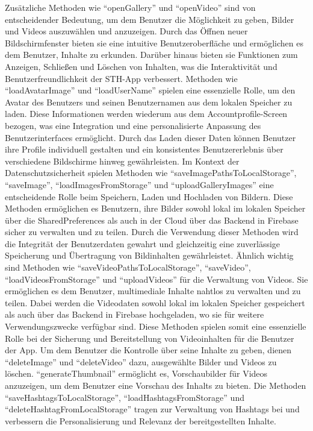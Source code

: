 Zusätzliche Methoden wie ``openGallery'' und ``openVideo'' sind von entscheidender Bedeutung, um dem Benutzer die Möglichkeit zu geben, Bilder und Videos auszuwählen und anzuzeigen. 
Durch das Öffnen neuer Bildschirmfenster bieten sie eine intuitive Benutzeroberfläche und ermöglichen es dem Benutzer, Inhalte zu erkunden. 
Darüber hinaus bieten sie Funktionen zum Anzeigen, Schließen und Löschen von Inhalten, was die Interaktivität und Benutzerfreundlichkeit der STH-App verbessert.
Methoden wie ``loadAvatarImage'' und ``loadUserName'' spielen eine essenzielle Rolle, um den Avatar des Benutzers und seinen Benutzernamen aus dem lokalen Speicher zu laden. 
Diese Informationen werden wiederum aus dem Accountprofile-Screen bezogen, was eine Integration und eine personalisierte Anpassung des Benutzerinterfaces ermöglicht. 
Durch das Laden dieser Daten können Benutzer ihre Profile individuell gestalten und ein konsistentes Benutzererlebnis über verschiedene Bildschirme hinweg gewährleisten. 
Im Kontext der Datenschutzsicherheit spielen Methoden wie ``saveImagePathsToLocalStorage'', ``saveImage'', ``loadImagesFromStorage'' und ``uploadGalleryImages'' eine entscheidende Rolle beim Speichern, Laden und Hochladen von Bildern. 
Diese Methoden ermöglichen es Benutzern, ihre Bilder sowohl lokal im lokalen Speicher über die SharedPreferences als auch in der Cloud über das Backend in Firebase sicher zu verwalten und zu teilen. 
Durch die Verwendung dieser Methoden wird die Integrität der Benutzerdaten gewahrt und gleichzeitig eine zuverlässige Speicherung und Übertragung von Bildinhalten gewährleistet. 
Ähnlich wichtig sind Methoden wie ``saveVideoPathsToLocalStorage'', ``saveVideo'', ``loadVideosFromStorage'' und ``uploadVideos'' für die Verwaltung von Videos.
Sie ermöglichen es dem Benutzer, multimediale Inhalte nahtlos zu verwalten und zu teilen. Dabei werden die Videodaten sowohl lokal im lokalen Speicher gespeichert als auch über das Backend in Firebase hochgeladen, wo sie für weitere Verwendungszwecke verfügbar sind.
Diese Methoden spielen somit eine essenzielle Rolle bei der Sicherung und Bereitstellung von Videoinhalten für die Benutzer der App.
Um dem Benutzer die Kontrolle über seine Inhalte zu geben, dienen ``deleteImage'' und ``deleteVideo'' dazu, ausgewählte Bilder und Videos zu löschen. 
``generateThumbnail'' ermöglicht es, Vorschaubilder für Videos anzuzeigen, um dem Benutzer eine Vorschau des Inhalts zu bieten.
Die Methoden ``saveHashtagsToLocalStorage'', ``loadHashtagsFromStorage'' und ``deleteHashtagFromLocalStorage'' tragen zur Verwaltung von Hashtags bei und verbessern die Personalisierung und Relevanz der bereitgestellten Inhalte. 
